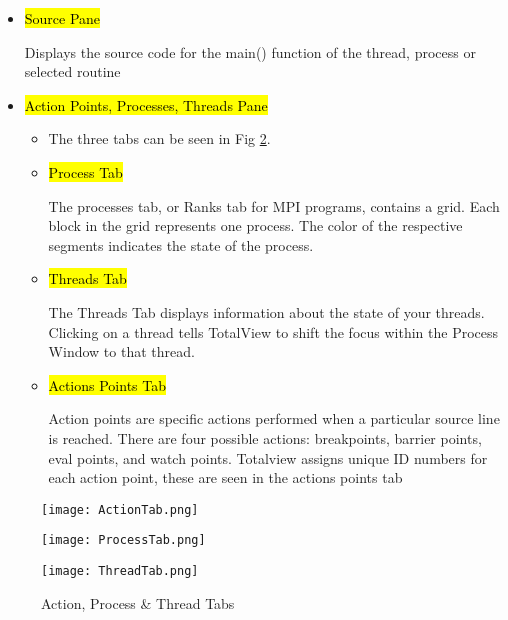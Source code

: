 \documentclass{article}
\begin{document}
\begin{itemize}
\begin{itemize}
		Displays information on the current thread's variables, ie allows users to see the current/stored values in existing variables. 
		The frame is seen in Fig \ref{fig:diving}.
		\begin{figure}[p] %
		\begin{center}
			\texttt{[image: SourceFrame.png]}
		\caption{Diving in Function}
		\label{fig:diving}
		\end{center}
	\end{figure}
		\item \hl{Source Pane}
		
		Displays the source code for the main() function of the thread, process or selected routine
		\item \hl{Action Points, Processes, Threads Pane}
		\begin{itemize}
		\item The three tabs can be seen in Fig \ref{fig:action_proc_thread_tabs}.
		\item \hl{Process Tab} 
		
		The processes tab, or Ranks tab for MPI programs, contains a grid. 
		Each block in the grid represents one process. 
		The color of the respective segments indicates the state of the process. 
		\item \hl{Threads Tab} 
		
		The Threads Tab displays information about the state of your threads. 
		Clicking on a thread tells TotalView to shift the focus within the Process Window to that thread.
		\item \hl{Actions Points Tab} 
		
		Action points are specific actions performed when a particular source line is reached. 
		There are four possible actions: breakpoints, barrier points, eval points, and watch points.
		Totalview assigns unique ID numbers for each action point, these are seen in the actions points tab
		\end{itemize}
	\end{itemize}
	\begin{figure}[p] %
		\begin{center}	
		\texttt{[image: ActionTab.png]}
		
		
		\texttt{[image: ProcessTab.png]}
		
		
		\texttt{[image: ThreadTab.png]}
		\caption{Action, Process \& Thread Tabs}
		\label{fig:action_proc_thread_tabs}
			\end{center}
	\end{figure}



\end{itemize}
\end{document}
